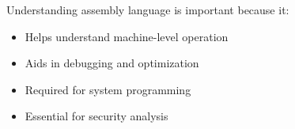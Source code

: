 \begin{remark}
Understanding assembly language is important because it:
\begin{itemize}
  \item Helps understand machine-level operation
  \item Aids in debugging and optimization
  \item Required for system programming
  \item Essential for security analysis
\end{itemize}
\end{remark}